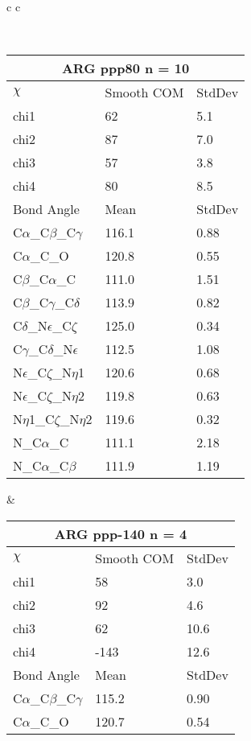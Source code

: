 \newpage

\begin{longtable}{ c c }

\caption{ARG Central Values}\\
  \begin{tabular}{ l l l }
  \toprule
  \multicolumn{3}{c}{ARG \textbf{ppp80} n = 10} \\ \toprule
  $\chi$       & Smooth COM & StdDev \\ \midrule
  chi1 & 62 & 5.1 \\ 
  chi2 & 87 & 7.0 \\ 
  chi3 & 57 & 3.8 \\ 
  chi4 & 80 & 8.5 \\ \midrule
  Bond Angle   & Mean     & StdDev \\ \midrule
  C$\alpha$\_C$\beta$\_C$\gamma$ & 116.1 & 0.88\\
  C$\alpha$\_C\_O & 120.8 & 0.55\\
  C$\beta$\_C$\alpha$\_C & 111.0 & 1.51\\
  C$\beta$\_C$\gamma$\_C$\delta$ & 113.9 & 0.82\\
  C$\delta$\_N$\epsilon$\_C$\zeta$ & 125.0 & 0.34\\
  C$\gamma$\_C$\delta$\_N$\epsilon$ & 112.5 & 1.08\\
  N$\epsilon$\_C$\zeta$\_N$\eta$1 & 120.6 & 0.68\\
  N$\epsilon$\_C$\zeta$\_N$\eta$2 & 119.8 & 0.63\\
  N$\eta$1\_C$\zeta$\_N$\eta$2 & 119.6 & 0.32\\
  N\_C$\alpha$\_C & 111.1 & 2.18\\
  N\_C$\alpha$\_C$\beta$ & 111.9 & 1.19\\
  \bottomrule
  \end{tabular}
  &
  \begin{tabular}{ l l l }
  \toprule
  \multicolumn{3}{c}{ARG \textbf{ppp-140} n = 4} \\ \toprule
  $\chi$       & Smooth COM & StdDev \\ \midrule
  chi1 & 58 & 3.0 \\ 
  chi2 & 92 & 4.6 \\ 
  chi3 & 62 & 10.6 \\ 
  chi4 & -143 & 12.6 \\ \midrule
  Bond Angle   & Mean     & StdDev \\ \midrule
  C$\alpha$\_C$\beta$\_C$\gamma$ & 115.2 & 0.90\\
  C$\alpha$\_C\_O & 120.7 & 0.54\\

\end{tabular}
\end{longtable}
